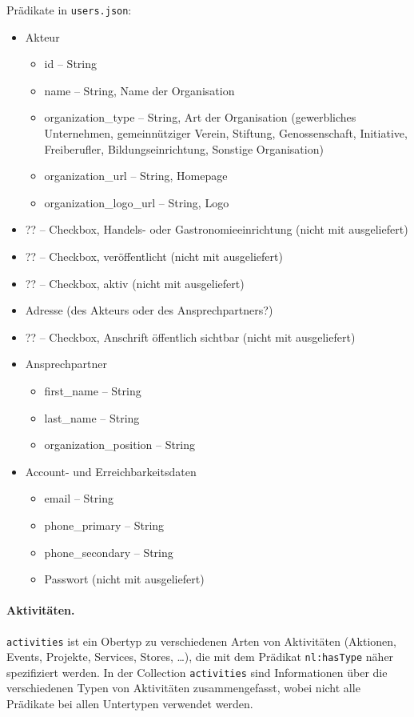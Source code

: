 \documentclass[a4paper,11pt]{article}
\begin{document}
Prädikate in \texttt{users.json}:
\begin{itemize}\itemsep0pt
\item Akteur
\begin{itemize}\itemsep0pt
  \item id -- String
  \item name -- String, Name der Organisation
  \item organization\_type -- String, Art der Organisation (gewerbliches
    Unternehmen, gemeinnütziger Verein, Stiftung, Genossenschaft, Initiative,
    Freiberufler, Bildungseinrichtung, Sonstige Organisation)
  \item organization\_url -- String, Homepage
  \item organization\_logo\_url -- String, Logo
\end{itemize}
\item ?? -- Checkbox, Handels- oder Gastronomieeinrichtung (nicht mit
  ausgeliefert)
\item ?? -- Checkbox, veröffentlicht (nicht mit ausgeliefert)
\item ?? -- Checkbox, aktiv (nicht mit ausgeliefert)
\item Adresse (des Akteurs oder des Ansprechpartners?)
\item ?? -- Checkbox, Anschrift öffentlich sichtbar (nicht mit ausgeliefert)
\item Ansprechpartner
\begin{itemize}\itemsep0pt
  \item first\_name -- String
  \item last\_name -- String
  \item organization\_position -- String
\end{itemize}
\item Account- und Erreichbarkeitsdaten
\begin{itemize}\itemsep0pt
  \item email -- String
  \item phone\_primary -- String
  \item phone\_secondary -- String
  \item Passwort (nicht mit ausgeliefert)
\end{itemize}
\end{itemize}

\paragraph{Aktivitäten.}
\texttt{activities} ist ein Obertyp zu verschiedenen Arten von Aktivitäten
(Aktionen, Events, Projekte, Services, Stores, \ldots), die mit dem Prädikat
\texttt{nl:hasType} näher spezifiziert werden.  In der Collection
\texttt{activities} sind Informationen über die verschiedenen Typen von
Aktivitäten zusammengefasst, wobei nicht alle Prädikate bei allen Untertypen
verwendet werden. 
\end{document}
